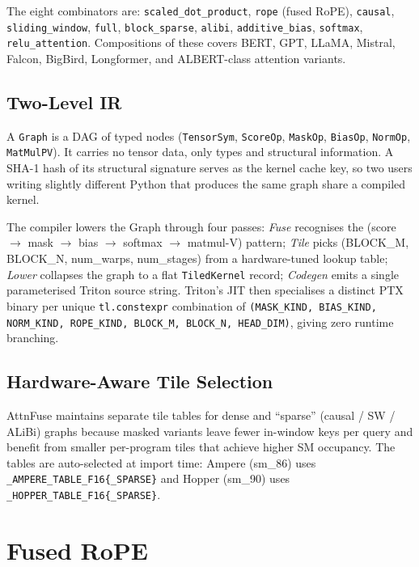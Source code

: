 \documentclass[10pt,twocolumn]{article}
\begin{document}
The eight combinators are: \texttt{scaled\_dot\_product},
\texttt{rope} (fused RoPE), \texttt{causal}, \texttt{sliding\_window},
\texttt{full}, \texttt{block\_sparse}, \texttt{alibi},
\texttt{additive\_bias}, \texttt{softmax}, \texttt{relu\_attention}.
Compositions of these covers BERT, GPT, LLaMA, Mistral, Falcon, BigBird,
Longformer, and ALBERT-class attention variants.

\subsection{Two-Level IR}
\label{sec:compiler}

A \texttt{Graph} is a DAG of typed nodes (\texttt{TensorSym},
\texttt{ScoreOp}, \texttt{MaskOp}, \texttt{BiasOp}, \texttt{NormOp},
\texttt{MatMulPV}). It carries no tensor data, only types and
structural information. A SHA-1 hash of its structural signature serves
as the kernel cache key, so two users writing slightly different Python
that produces the same graph share a compiled kernel.

The compiler lowers the Graph through four passes: \emph{Fuse}
recognises the (score $\to$ mask $\to$ bias $\to$ softmax $\to$ matmul-V)
pattern; \emph{Tile} picks (BLOCK\_M, BLOCK\_N, num\_warps, num\_stages)
from a hardware-tuned lookup table; \emph{Lower} collapses the graph to
a flat \texttt{TiledKernel} record; \emph{Codegen} emits a single
parameterised Triton source string. Triton's JIT then specialises a
distinct PTX binary per unique \texttt{tl.constexpr} combination of
\texttt{(MASK\_KIND, BIAS\_KIND, NORM\_KIND, ROPE\_KIND, BLOCK\_M,
BLOCK\_N, HEAD\_DIM)}, giving zero runtime branching.

\subsection{Hardware-Aware Tile Selection}

AttnFuse maintains separate tile tables for dense and ``sparse''
(causal / SW / ALiBi) graphs because masked variants leave fewer
in-window keys per query and benefit from smaller per-program tiles
that achieve higher SM occupancy. The tables are auto-selected at
import time: Ampere (sm\_86) uses \texttt{\_AMPERE\_TABLE\_F16\{\_SPARSE\}}
and Hopper (sm\_90) uses \texttt{\_HOPPER\_TABLE\_F16\{\_SPARSE\}}.

\section{Fused RoPE}
\label{sec:rope}
\end{document}
